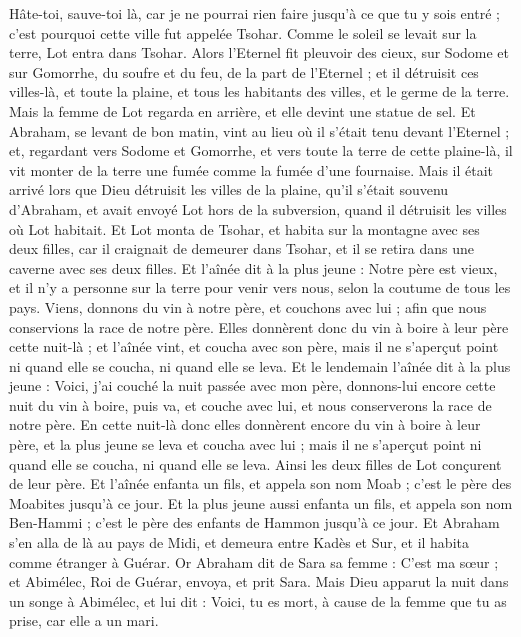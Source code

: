 \begin{multicols}{2}
Hâte-toi, sauve-toi là, car je ne pourrai rien faire jusqu'à ce que tu y sois entré ; c'est pourquoi cette ville fut appelée Tsohar.
Comme le soleil se levait sur la terre, Lot entra dans Tsohar.
Alors l'Eternel fit pleuvoir des cieux, sur Sodome et sur Gomorrhe, du soufre et du feu, de la part de l'Eternel ;
et il détruisit ces villes-là, et toute la plaine, et tous les habitants des villes, et le germe de la terre.
Mais la femme de Lot regarda en arrière, et elle devint une statue de sel.
Et Abraham, se levant de bon matin, vint au lieu où il s'était tenu devant l'Eternel ;
et, regardant vers Sodome et Gomorrhe, et vers toute la terre de cette plaine-là, il vit monter de la terre une fumée comme la fumée d'une fournaise.
Mais il était arrivé lors que Dieu détruisit les villes de la plaine, qu'il s'était souvenu d'Abraham, et avait envoyé Lot hors de la subversion, quand il détruisit les villes où Lot habitait.
Et Lot monta de Tsohar, et habita sur la montagne avec ses deux filles, car il craignait de demeurer dans Tsohar, et il se retira dans une caverne avec ses deux filles.
Et l'aînée dit à la plus jeune : Notre père est vieux, et il n'y a personne sur la terre pour venir vers nous, selon la coutume de tous les pays.
Viens, donnons du vin à notre père, et couchons avec lui ; afin que nous conservions la race de notre père.
Elles donnèrent donc du vin à boire à leur père cette nuit-là ; et l'aînée vint, et coucha avec son père, mais il ne s'aperçut point ni quand elle se coucha, ni quand elle se leva.
Et le lendemain l'aînée dit à la plus jeune : Voici, j'ai couché la nuit passée avec mon père, donnons-lui encore cette nuit du vin à boire, puis va, et couche avec lui, et nous conserverons la race de notre père.
En cette nuit-là donc elles donnèrent encore du vin à boire à leur père, et la plus jeune se leva et coucha avec lui ; mais il ne s'aperçut point ni quand elle se coucha, ni quand elle se leva.
Ainsi les deux filles de Lot conçurent de leur père.
Et l'aînée enfanta un fils, et appela son nom Moab ; c'est le père des Moabites jusqu'à ce jour.
Et la plus jeune aussi enfanta un fils, et appela son nom Ben-Hammi ; c'est le père des enfants de Hammon jusqu'à ce jour.
\VerseOne{}Et Abraham s'en alla de là au pays de Midi, et demeura entre Kadès et Sur, et il habita comme étranger à Guérar.
Or Abraham dit de Sara sa femme : C'est ma sœur ; et Abimélec, Roi de Guérar, envoya, et prit Sara.
Mais Dieu apparut la nuit dans un songe à Abimélec, et lui dit : Voici, tu es mort, à cause de la femme que tu as prise, car elle a un mari.

\end{multicols}

